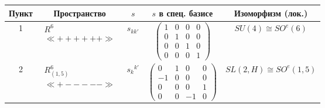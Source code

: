 \begin{center}


\begin{tabular}{|c|c|c|c|c|}


\hline


Пункт & Пространство & $s$ &  $s$ в спец. базисе & Изоморфизм (лок.)\\


\hline


1 &


$\begin{array}{c} R^6\\ \ll ++++++ \gg \end{array}$ &


$s_{kk'}$ &


$


\begin{pmatrix}


1 & 0 & 0 & 0\\


0 & 1 & 0 & 0\\


0 & 0 & 1 & 0\\


0 & 0 & 0 & 1


\end{pmatrix}


$&


$SU(4) \cong SO^e(6)$\\


\hline


2 &


$\begin{array}{c} R^6_{(1,5)}\\ \ll +----- \gg \end{array}$ &


$s_k{}^{k'}$ &


$


\begin{pmatrix}


0 & 1 & 0 & 0\\


-1 & 0 & 0 & 0\\


0 & 0 & 0 & 1\\


0 & 0 &-1 & 0


\end{pmatrix}


$&


$SL(2,H) \cong SO^e(1,5)$\\



\end{tabular}
\end{center}
